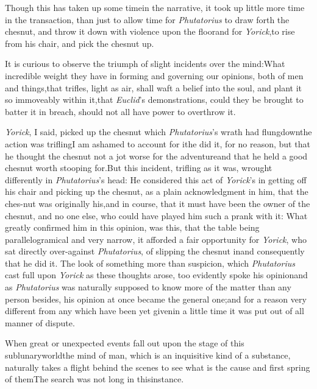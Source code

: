 \documentclass{article}
\begin{document}
Though this has taken up some time\break in the narrative, it took up
little more time in the transaction, than just to allow time for
\textit{Phutatorius} to draw forth the chesnut, and throw it down
with violence upon the floor\tsk and for
\textit{Yorick},\break to rise
from his chair, and pick the chesnut up.

It is curious to observe the triumph of slight incidents over
the mind:\tsh What incredible weight they have in forming\pb
and governing our opinions, both of men and things,\tsk that
trifles, light as air, shall waft a belief into the soul,
and plant it so immoveably within it,\tsk that
\textit{Euclid}’s demonstrations, could they be brought to
batter it in breach, should not all have power to overthrow
it.

\textit{Yorick}, I said, picked up the chesnut which
\textit{Phutatorius}’s wrath had flung\break down\tsk the action
was trifling\tsk I am ashamed to account for it\tsk he did
it, for no reason, but that he thought the chesnut not a jot
worse for the adventure\tsk and that he held a good chesnut
worth stooping for.\tsk But this incident, trifling as it
was, wrought differently in \textit{Phutatorius}’s head: He
considered this act of \textit{Yorick}’s in getting off his
chair and picking up the chesnut, as a plain acknowledgment
in him, that the ches-\pb nut was originally his,\tsk and in
course, that it must have been the owner of the chesnut, and
no one else, who could have played him such a prank with it:
What greatly confirmed him in this opinion, was this, that
the table being parallelogramical and very narrow, it
afforded a fair opportunity for \textit{Yorick}, who sat
directly over-against \textit{Phutatorius}, of slipping the
chesnut in\tsh and consequently that he did it. The look of
something more than suspicion, which \textit{Phutatorius}
cast full upon \textit{Yorick} as these thoughts arose, too
evidently spoke his opinion\tsh and as \textit{Phutatorius}
was naturally supposed to know more of the matter than any
person besides, his opinion at once became the general
one;\tsh and for a reason very different from any which have
been yet given\tsh in a little time it was put out of all
manner of dispute.

\newpage
When great or unexpected events fall out upon the stage of this
sublunary\break world\tsk the mind of man, which is an
inquisitive kind of a substance, naturally takes a flight behind
the scenes to see what is the cause and first spring
of\break
them\tsk The search was not long in this\break instance.
\end{document}
